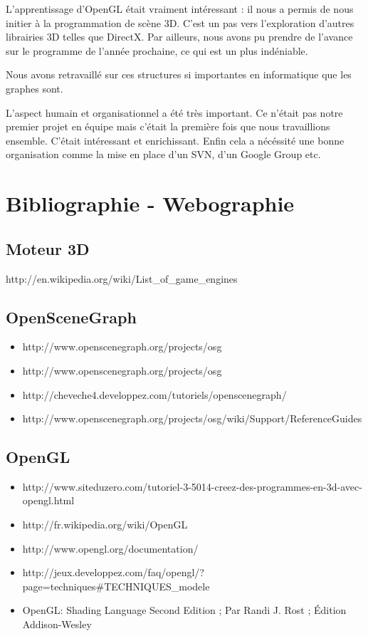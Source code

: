 \documentclass[a4paper,12pt]{report}
\begin{document}
L'apprentissage d'OpenGL était vraiment intéressant : il nous a permis de nous initier à la programmation de scène 3D. C'est un pas vers l'exploration d'autres librairies 3D telles que DirectX. Par ailleurs, nous avons pu prendre de l'avance sur le programme de l'année prochaine, ce qui est un plus indéniable.

Nous avons retravaillé sur ces structures si importantes en informatique que les graphes sont.

L'aspect humain et organisationnel a été très important. Ce n'était pas notre premier projet en équipe mais c'était la première fois que nous travaillions ensemble. C'était intéressant et enrichissant. Enfin cela a nécéssité une bonne organisation comme la mise en place d'un SVN, d'un Google Group etc.


\chapter*{Bibliographie - Webographie}

\section*{Moteur 3D}

    http://en.wikipedia.org/wiki/List\_of\_game\_engines

\section*{OpenSceneGraph}
\begin{itemize}
 \item http://www.openscenegraph.org/projects/osg
 
 \item http://www.openscenegraph.org/projects/osg
 
 \item http://cheveche4.developpez.com/tutoriels/openscenegraph/
 
 \item http://www.openscenegraph.org/projects/osg/wiki/Support/ReferenceGuides
\end{itemize}


\section*{OpenGL}
\begin{itemize}
 \item http://www.siteduzero.com/tutoriel-3-5014-creez-des-programmes-en-3d-avec-opengl.html

 \item http://fr.wikipedia.org/wiki/OpenGL

 \item http://www.opengl.org/documentation/

 \item http://jeux.developpez.com/faq/opengl/?page=techniques\#TECHNIQUES\_modele

 \item OpenGL: Shading Language Second Edition ; Par Randi J. Rost ; Édition Addison-Wesley 
\end{itemize}
\end{document}

